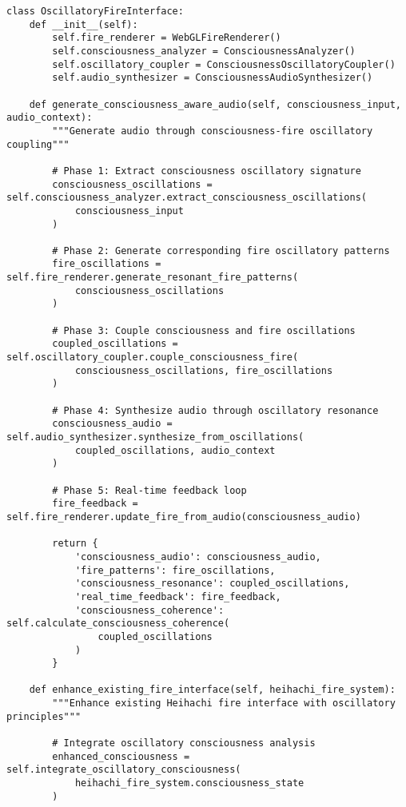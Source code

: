 \documentclass[12pt,a4paper]{article}
\begin{document}
\begin{lstlisting}[style=pythonstyle, caption=Oscillatory Fire Interface Enhancement]
class OscillatoryFireInterface:
    def __init__(self):
        self.fire_renderer = WebGLFireRenderer()
        self.consciousness_analyzer = ConsciousnessAnalyzer()
        self.oscillatory_coupler = ConsciousnessOscillatoryCoupler()
        self.audio_synthesizer = ConsciousnessAudioSynthesizer()
        
    def generate_consciousness_aware_audio(self, consciousness_input, audio_context):
        """Generate audio through consciousness-fire oscillatory coupling"""
        
        # Phase 1: Extract consciousness oscillatory signature
        consciousness_oscillations = self.consciousness_analyzer.extract_consciousness_oscillations(
            consciousness_input
        )
        
        # Phase 2: Generate corresponding fire oscillatory patterns
        fire_oscillations = self.fire_renderer.generate_resonant_fire_patterns(
            consciousness_oscillations
        )
        
        # Phase 3: Couple consciousness and fire oscillations
        coupled_oscillations = self.oscillatory_coupler.couple_consciousness_fire(
            consciousness_oscillations, fire_oscillations
        )
        
        # Phase 4: Synthesize audio through oscillatory resonance
        consciousness_audio = self.audio_synthesizer.synthesize_from_oscillations(
            coupled_oscillations, audio_context
        )
        
        # Phase 5: Real-time feedback loop
        fire_feedback = self.fire_renderer.update_fire_from_audio(consciousness_audio)
        
        return {
            'consciousness_audio': consciousness_audio,
            'fire_patterns': fire_oscillations,
            'consciousness_resonance': coupled_oscillations,
            'real_time_feedback': fire_feedback,
            'consciousness_coherence': self.calculate_consciousness_coherence(
                coupled_oscillations
            )
        }
    
    def enhance_existing_fire_interface(self, heihachi_fire_system):
        """Enhance existing Heihachi fire interface with oscillatory principles"""
        
        # Integrate oscillatory consciousness analysis
        enhanced_consciousness = self.integrate_oscillatory_consciousness(
            heihachi_fire_system.consciousness_state
        )
        

\end{lstlisting}
\end{document}

